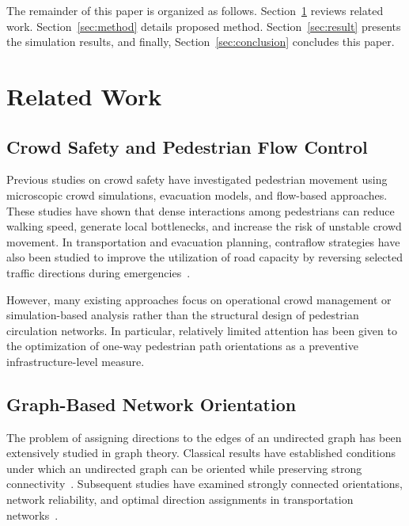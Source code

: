 \documentclass[twocolumn,a4paper]{article} %
\begin{document}
The remainder of this paper is organized as follows. Section~\ref{sec:related} reviews related work. Section~\ref{sec:method} details proposed method. Section~\ref{sec:result} presents the simulation results, and finally, Section~\ref{sec:conclusion} concludes this paper.

\section{Related Work}
\label{sec:related}

\subsection{Crowd Safety and Pedestrian Flow Control}
\label{subsec:related_crowd}

Previous studies on crowd safety have investigated pedestrian movement using microscopic crowd simulations, evacuation models, and flow-based approaches. 
These studies have shown that dense interactions among pedestrians can reduce walking speed, generate local bottlenecks, and increase the risk of unstable crowd movement. 
In transportation and evacuation planning, contraflow strategies have also been studied to improve the utilization of road capacity by reversing selected traffic directions during emergencies~\cite{kim2008contraflow, aksu2014mathematical}. 

However, many existing approaches focus on operational crowd management or simulation-based analysis rather than the structural design of pedestrian circulation networks. 
In particular, relatively limited attention has been given to the optimization of one-way pedestrian path orientations as a preventive infrastructure-level measure.

\subsection{Graph-Based Network Orientation}
\label{subsec:related_graph}

The problem of assigning directions to the edges of an undirected graph has been extensively studied in graph theory. 
Classical results have established conditions under which an undirected graph can be oriented while preserving strong connectivity~\cite{robbins1939theorem}. 
Subsequent studies have examined strongly connected orientations, network reliability, and optimal direction assignments in transportation networks~\cite{chung1985strongly, roberts1988optimal, roberts1994optimal}. 
\end{document}
